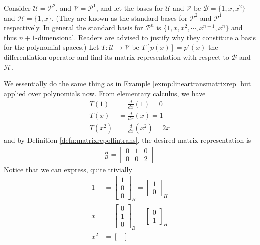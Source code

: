 \begin{exmp}
\label{exmp:lineartransderivative}
Consider $\mathcal{U} = \mathcal{P}^2$, and $\mathcal{V} = \mathcal{P}^1$, and let the bases for $\mathcal{U}$ and $\mathcal{V}$ be $\mathcal{B} = \{1, x, x^2\}$ and $\mathcal{H} = \{1, x\}$. (They are known as the standard bases for $\mathcal{P}^2$ and $\mathcal{P}^1$ respectively. In general the standard basis for $\mathcal{P}^n$ is $\{1, x, x^2, \cdots, x^{n-1}, x^n\}$ and thus $n+1$-dimensional. Readers are advised to justify why they constitute a basis for the polynomial spaces.) Let $T: \mathcal{U} \to \mathcal{V}$ be $T[p(x)] = p'(x)$ the differentiation operator and find its matrix representation with respect to $\mathcal{B}$ and $\mathcal{H}$.
\end{exmp}
\begin{solution}
We essentially do the same thing as in Example \ref{exmp:lineartransmatrixrep} but applied over polynomials now. From elementary calculus, we have
\begin{align*}
T(1) &= \frac{d}{dx}(1) = 0 \\
T(x) &= \frac{d}{dx}(x) = 1 \\
T(x^2) &= \frac{d}{dx}(x^2) = 2x
\end{align*}
and by Definition \ref{defn:matrixrepoflintrans}, the desired matrix representation is
\begin{align*}
[T]_B^H = 
\begin{bmatrix}
0 & 1 & 0 \\
0 & 0 & 2
\end{bmatrix}
\end{align*}
Notice that we can express, quite trivially
\begin{align*}
1 &= \begin{bmatrix}
1 \\
0 \\
0
\end{bmatrix}_B
=
\begin{bmatrix}
1 \\
0
\end{bmatrix}_H \\
x &= \begin{bmatrix}
0 \\
1 \\
0
\end{bmatrix}_B
=
\begin{bmatrix}
0 \\
1
\end{bmatrix}_H \\
x^2 &= \begin{bmatrix}

\end{bmatrix}
\end{align*}
\end{solution}
